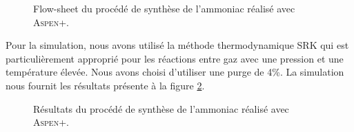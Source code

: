 \begin{figure}
	\centering
	\caption{Flow-sheet du procédé de synthèse de l'ammoniac
	réalisé avec \textsc{Aspen+}.}
	\label{fig:flow-sheet-aspen}
\end{figure}

Pour la simulation, nous avons utilisé la méthode
thermodynamique \textsc{SRK} qui est particulièrement
approprié pour les réactions entre gaz avec une pression
et une température élevée. Nous avons choisi d'utiliser
une purge de 4\%. La simulation nous fournit les résultats
présente à la figure \ref{fig:resultats-aspen}.

\begin{figure}
	\centering
	\caption{Résultats du procédé de synthèse de l'ammoniac
	réalisé avec \textsc{Aspen+}.}
	\label{fig:resultats-aspen}
\end{figure}

